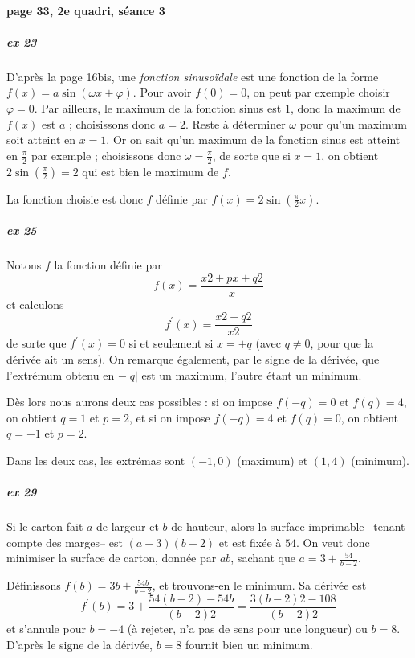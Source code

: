 \paragraph{page 33, 2e quadri, séance 3}

\subparagraph{ex 23}
D'après la page 16bis, une \emph{fonction sinusoïdale} est une fonction de la forme $f(x) = a \sin(\omega x + \varphi)$. Pour avoir $f(0) = 0$, on peut par exemple choisir $\varphi = 0$. Par ailleurs, le maximum de la fonction sinus est $1$, donc la maximum de $f(x)$ est $a$ ; choisissons donc $a = 2$. Reste à déterminer $\omega$ pour qu'un maximum soit atteint en $x = 1$. Or on sait qu'un maximum de la fonction sinus est atteint en $\frac\pi2$ par exemple ; choisissons donc $\omega = \frac\pi2$, de sorte que si $x = 1$, on obtient $2 \sin(\frac\pi2) = 2$ qui est bien le maximum de $f$.

La fonction choisie est donc $f$ définie par $f(x) = 2 \sin(\frac \pi 2 x)$.

\subparagraph{ex 25}
Notons $f$ la fonction définie par
\begin{equation*}
	f(x) = \frac{x2+px+q2}{x}
\end{equation*}
et calculons
\begin{equation*}
	f^\prime(x) = \frac{x2-q2}{x2}
\end{equation*}
de sorte que $f^\prime(x) = 0$ si et seulement si $x = \pm q$ (avec $q \neq 0$, pour que la dérivée ait un sens). On remarque également, par le signe de la dérivée, que l'extrémum obtenu en $-| q |$ est un maximum, l'autre étant un minimum.

Dès lors nous aurons deux cas possibles : si on impose $f(-q) = 0$ et
$f(q) = 4$, on obtient $q = 1$ et $p = 2$, et si on impose $f(-q) = 4$
et $f(q) = 0$, on obtient $q = -1$ et $p = 2$.

Dans les deux cas, les extrémas sont $(-1,0)$ (maximum) et $(1,4)$
(minimum).

\subparagraph{ex 29}
Si le carton fait $a$ de largeur et $b$ de hauteur, alors la surface
imprimable --tenant compte des marges-- est $(a-3)(b-2)$ et est fixée
à $54$. On veut donc minimiser la surface de carton, donnée par $ab$,
sachant que $a = 3 + \frac{54}{b-2}$.

Définissons $f(b) = 3b + \frac{54b}{b-2}$, et trouvons-en le
minimum. Sa dérivée est
\begin{equation*}
  f^\prime(b) = 3 + \frac{54(b-2) - 54b}{(b-2)2} = \frac{3 (b-2)2 - 108}{(b-2)2}
\end{equation*}
et s'annule pour $b = -4$ (à rejeter, n'a pas de sens pour une
longueur) ou $b = 8$. D'après le signe de la dérivée, $b = 8$ fournit
bien un minimum.


